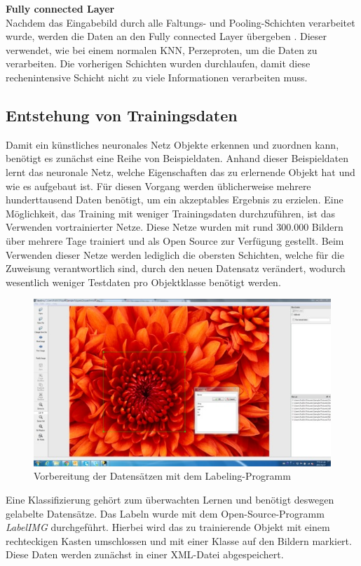 \textbf{Fully connected Layer}\\
Nachdem das Eingabebild durch alle Faltungs- und Pooling-Schichten verarbeitet wurde, werden die Daten an den Fully connected Layer übergeben \cite[14]{sermanet2012convolutional}. Dieser verwendet, wie bei einem normalen KNN, Perzeproten, um die Daten zu verarbeiten. Die vorherigen Schichten wurden durchlaufen, damit diese rechenintensive Schicht nicht zu viele Informationen verarbeiten muss. 
  \subsection{Entstehung von Trainingsdaten}\label{s.trainingsdaten} 
Damit ein künstliches neuronales Netz Objekte erkennen und zuordnen kann, benötigt es zunächst eine Reihe von Beispieldaten. Anhand dieser Beispieldaten lernt das neuronale Netz, welche Eigenschaften das zu erlernende Objekt hat und wie es aufgebaut ist. Für diesen Vorgang werden üblicherweise mehrere hunderttausend Daten benötigt, um ein akzeptables Ergebnis zu erzielen. Eine Möglichkeit, das Training mit weniger Trainingsdaten durchzuführen, ist das Verwenden vortrainierter Netze. Diese Netze wurden mit rund 300.000 Bildern über mehrere Tage trainiert und als Open Source zur Verfügung gestellt. Beim Verwenden dieser Netze werden lediglich die obersten Schichten, welche für die Zuweisung verantwortlich sind, durch den neuen Datensatz verändert, wodurch wesentlich weniger Testdaten pro Objektklasse benötigt werden. 
\begin{figure}
	[h]
	\centering
	\includegraphics[scale=0.7]{Sources/labelimg.jpg}
	\caption{Vorbereitung der Datensätzen mit dem Labeling-Programm \cite{labelimg2019}}
	\label{img:labelimg}
\end{figure}
Eine Klassifizierung gehört zum überwachten Lernen und benötigt deswegen gelabelte Datensätze. Das Labeln wurde mit dem Open-Source-Programm \textit{LabelIMG} \cite{labelimg2019} durchgeführt. Hierbei wird das zu trainierende Objekt mit einem rechteckigen Kasten umschlossen und mit einer Klasse auf den Bildern markiert. Diese Daten werden zunächst in einer XML-Datei abgespeichert. 
